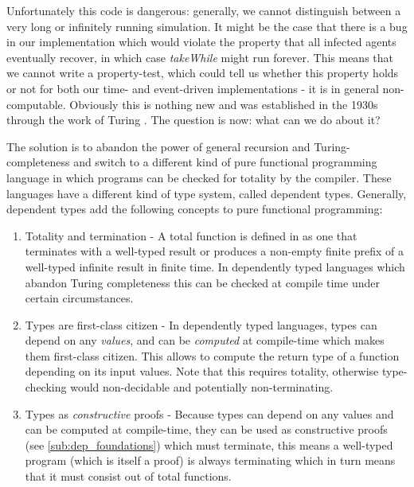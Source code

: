 Unfortunately this code is dangerous: generally, we cannot distinguish between a very long or infinitely running simulation. It might be the case that there is a bug in our implementation which would violate the property that all infected agents eventually recover, in which case \textit{takeWhile} might run forever. This means that we cannot write a property-test, which could tell us whether this property holds or not for both our time- and event-driven implementations - it is in general non-computable. Obviously this is nothing new and was established in the 1930s through the work of Turing \cite{turing_computable_1937}. The question is now: what can we do about it?

The solution is to abandon the power of general recursion and Turing-completeness and switch to a different kind of pure functional programming language in which programs can be checked for totality by the compiler. These languages have a different kind of type system, called dependent types. Generally, dependent types add the following concepts to pure functional programming:

\begin{enumerate}
	\item Totality and termination - A total function is defined in \cite{brady_type-driven_2017} as one that terminates with a well-typed result or produces a non-empty finite prefix of a well-typed infinite result in finite time. In dependently typed languages which abandon Turing completeness this can be checked at compile time under certain circumstances.
	
	\item Types are first-class citizen - In dependently typed languages, types can depend on any \textit{values}, and can be \textit{computed} at compile-time which makes them first-class citizen. This allows to compute the return type of a function depending on its input values. Note that this requires totality, otherwise type-checking would non-decidable and potentially non-terminating.
	
	\item Types as \textit{constructive} proofs - Because types can depend on any values and can be computed at compile-time, they can be used as constructive proofs (see \ref{sub:dep_foundations}) which must terminate, this means a well-typed program (which is itself a proof) is always terminating which in turn means that it must consist out of total functions.
\end{enumerate}

